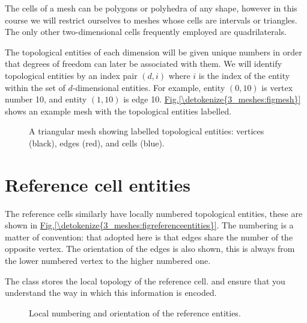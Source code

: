 \documentclass{book}
\begin{document}
The cells of a mesh can be polygons or polyhedra of any shape, however
in this course we will restrict ourselves to meshes whose cells are
intervals or triangles. The only other two-dimensional cells
frequently employed are quadrilaterals.

The topological entities of each dimension will be given unique
numbers in order that degrees of freedom can later be associated with
them. We will identify topological entities by an index pair \((d, i)\)
where \(i\) is the index of the entity within the set of \(d\)-dimensional
entities. For example, entity \((0, 10)\) is vertex number 10, and
entity \((1, 10)\) is edge 10. \hyperref[\detokenize{3_meshes:figmesh}]{Fig.\@ \ref{\detokenize{3_meshes:figmesh}}} shows an example
mesh with the topological entities labelled.

\begin{figure}[htbp]
\centering
\capstart

\noindent{}
\caption{A triangular mesh showing labelled topological entities: vertices
(black), edges (red), and cells (blue).}\label{\detokenize{3_meshes:figmesh}}\label{\detokenize{3_meshes:id3}}\end{figure}


\section{Reference cell entities}
\label{\detokenize{3_meshes:reference-cell-entities}}
The reference cells similarly have locally numbered topological
entities, these are shown in \hyperref[\detokenize{3_meshes:figreferenceentities}]{Fig.\@ \ref{\detokenize{3_meshes:figreferenceentities}}}. The
numbering is a matter of convention: that adopted here is that edges
share the number of the opposite vertex. The orientation of the edges
is also shown, this is always from the lower numbered vertex to the
higher numbered one.

The  class stores the
local topology of the reference cell.  and ensure that you
understand the way in which this information is encoded.

\begin{figure}[htbp]
\centering
\capstart

\noindent{}
\caption{Local numbering and orientation of the reference entities.}\label{\detokenize{3_meshes:figreferenceentities}}\label{\detokenize{3_meshes:id4}}\end{figure}
\end{document}
